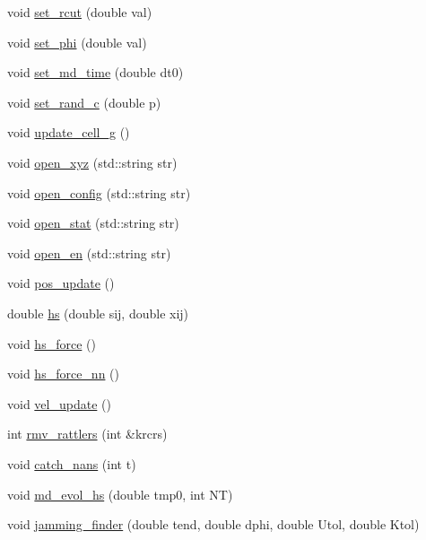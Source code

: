 \begin{DoxyCompactItemize}
\item 
void \mbox{\hyperlink{classpacking_a073820579ccf298710943fefe023d853}{set\+\_\+rcut}} (double val)
\item 
void \mbox{\hyperlink{classpacking_af02fd953055fe009e6d3e79cc7a22eb8}{set\+\_\+phi}} (double val)
\item 
void \mbox{\hyperlink{classpacking_aab96c0f738b9ff52cf5eb9deba301387}{set\+\_\+md\+\_\+time}} (double dt0)
\item 
void \mbox{\hyperlink{classpacking_ab1b640756b858f5df25d88ab841300b2}{set\+\_\+rand\+\_\+c}} (double p)
\item 
void \mbox{\hyperlink{classpacking_a7d0e7e1a244a3cb1080a5b8c189a3373}{update\+\_\+cell\+\_\+g}} ()
\item 
void \mbox{\hyperlink{classpacking_a0c837c1a1a49e78d98e3caa99452ba48}{open\+\_\+xyz}} (std\+::string str)
\item 
void \mbox{\hyperlink{classpacking_a0c981ac48ac009de032b346acd442527}{open\+\_\+config}} (std\+::string str)
\item 
void \mbox{\hyperlink{classpacking_aafe0cb05420e66caa923930222ff1bb0}{open\+\_\+stat}} (std\+::string str)
\item 
void \mbox{\hyperlink{classpacking_a8afd538218a84fa24e14d58ecbd8066b}{open\+\_\+en}} (std\+::string str)
\item 
void \mbox{\hyperlink{classpacking_a0674ff540e56b7de2919fea2960b7703}{pos\+\_\+update}} ()
\item 
double \mbox{\hyperlink{classpacking_a87346c3bda1750e3a75fcb626ccaf82f}{hs}} (double sij, double xij)
\item 
void \mbox{\hyperlink{classpacking_a2506d13784217eda51bcb99b6005c94d}{hs\+\_\+force}} ()
\item 
void \mbox{\hyperlink{classpacking_aee29c91dd4747aca62cfecfb5197f87a}{hs\+\_\+force\+\_\+nn}} ()
\item 
void \mbox{\hyperlink{classpacking_a027c3c89940dc7e8b317368ed32cfc15}{vel\+\_\+update}} ()
\item 
int \mbox{\hyperlink{classpacking_a6c94dc46459e4acd96bc99d43ed257b2}{rmv\+\_\+rattlers}} (int \&krcrs)
\item 
void \mbox{\hyperlink{classpacking_ac31d7a9a0e3fde8ca3b527f6fc3f2b45}{catch\+\_\+nans}} (int t)
\item 
void \mbox{\hyperlink{classpacking_a4a4cc64305d5f1726e1a49e5a395f7e9}{md\+\_\+evol\+\_\+hs}} (double tmp0, int NT)
\item 
void \mbox{\hyperlink{classpacking_aa78e20cbe7bb48eb52a319a7eaac0b92}{jamming\+\_\+finder}} (double tend, double dphi, double Utol, double Ktol)

\end{DoxyCompactItemize}
